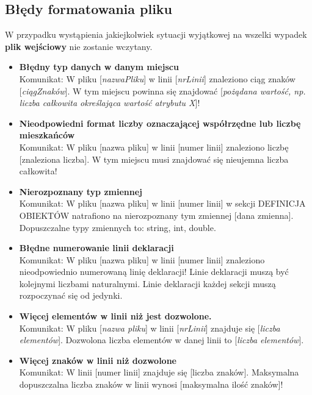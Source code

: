\documentclass[a4paper, 10pt, titlepage]{article}
\begin{document}
\subsection{Błędy formatowania pliku}
W przypadku wystąpienia jakiejkolwiek sytuacji wyjątkowej na wszelki wypadek \textbf{plik wejściowy} nie zostanie wczytany.
\begin{itemize}
\item \textbf{Błędny typ danych w danym miejscu}
\\Komunikat: W pliku [\textit{nazwaPliku}] w linii [\textit{nrLinii}] znaleziono ciąg znaków [\textit{ciągZnaków}]. W tym miejscu powinna się znajdować [\textit{pożądana wartość, np. liczba całkowita określająca wartość atrybutu X}]!

\item \textbf{Nieodpowiedni format liczby oznaczającej współrzędne lub liczbę mieszkańców}
\\Komunikat: W pliku [nazwa pliku] w linii [numer linii] znaleziono liczbę [znaleziona liczba]. W tym miejscu musi znajdować się nieujemna liczba całkowita!

\item \textbf{Nierozpoznany typ zmiennej}
\\Komunikat: W pliku [nazwa pliku] w linii [numer linii] w sekcji DEFINICJA OBIEKTÓW natrafiono na nierozpoznany tym zmiennej [dana zmienna]. Dopuszczalne typy zmiennych to: string, int, double.

\item \textbf{Błędne numerowanie linii deklaracji}
\\Komunikat: W pliku [nazwa pliku] w linii [numer linii] znaleziono nieodpowiednio numerowaną linię deklaracji! Linie deklaracji muszą być kolejnymi liczbami naturalnymi. Linie deklaracji każdej sekcji muszą rozpoczynać się od jedynki.

\item \textbf{Więcej elementów w linii niż jest dozwolone.}
\\Komunikat: W pliku [\textit{nazwa pliku}] w linii [\textit{nrLinii}] znajduje się [\textit{liczba elementów}]. Dozwolona liczba elementów w danej linii to [\textit{liczba elementów}].

\item \textbf{Więcej znaków w linii niż dozwolone}
\\Komunikat: W linii [numer linii] znajduje się [liczba znaków]. Maksymalna dopuszczalna liczba znaków w linii wynosi [maksymalna ilość znaków]!


\end{itemize}
\end{document}
